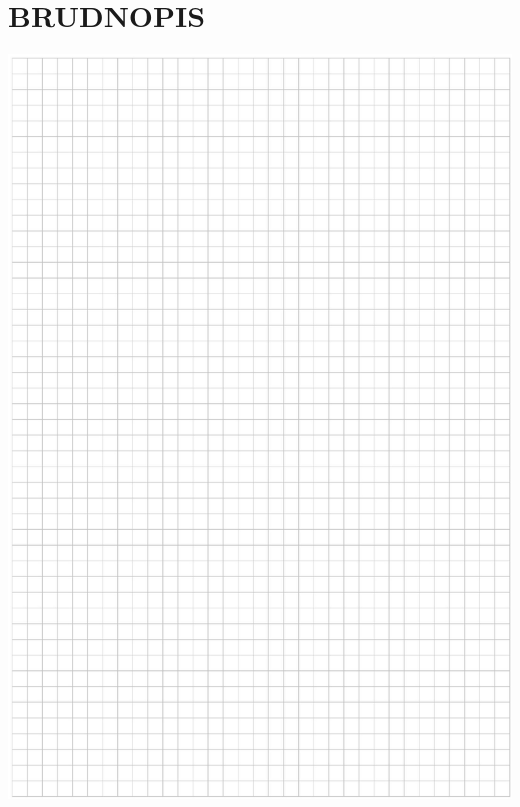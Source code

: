 \documentclass[10pt]{article}
\begin{document}
\section*{BRUDNOPIS}
\begin{center}
\includegraphics[max width=\textwidth]{2024_11_21_dcf819de2d2eef051a0dg-03}
\end{center}
\end{document}
